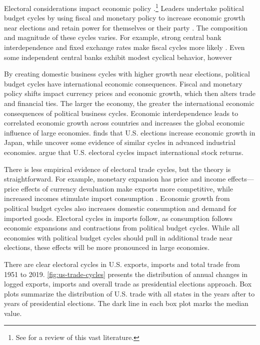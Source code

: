 \documentclass[12pt]{article}
\begin{document}
Electoral considerations impact economic policy \citep{Nordhaus1975}.\footnote{See \citet{Dubois2016} for a review of this vast literature.} 
Leaders undertake political budget cycles by using fiscal and monetary policy to increase economic growth near elections and retain power for themselves or their party \citep{Tufte1978, Rogoff1987}. 
The composition and magnitude of these cycles varies. 
For example, strong central bank interdependence and fixed exchange rates make fiscal cycles more likely \citep{ClarkHallerberg2000}. 
Even some independent central banks exhibit modest cyclical behavior, however \citep[pg. 247]{Dubois2016}


By creating domestic business cycles with higher growth near elections, political budget cycles have international economic consequences.
Fiscal and monetary policy shifts impact currency prices and economic growth, which then alters trade and financial ties. 
The larger the economy, the greater the international economic consequences of political business cycles.
Economic interdependence leads to correlated economic growth across countries \citep{ArtisZhang1999, Kayser2006} and increases the global economic influence of large economies. 
\citet{Ito1991} finds that U.S. elections increase economic growth in Japan, while \citet{ThompsonZuk1983} uncover some evidence of similar cycles in advanced industrial economies.
\citet{FoersterSchmitz1997} argue that U.S. electoral cycles impact international stock returns.


There is less empirical evidence of electoral trade cycles, but the theory is straightforward.
For example, monetary expansion has price and income effects--- price effects of currency devaluation make exports more competitive, while increased incomes stimulate import consumption \citep{Sumner2021}.
Economic growth from political budget cycles also increases domestic consumption and demand for imported goods. 
Electoral cycles in imports follow, as consumption follows economic expansions and contractions from political budget cycles.  
While all economies with political budget cycles should pull in additional trade near elections, these effects will be more pronounced in large economies. 


There are clear electoral cycles in U.S. exports, imports and total trade from 1951 to 2019. 
\autoref{fig:us-trade-cycles} presents the distribution of annual changes in logged exports, imports and overall trade as presidential elections approach.
Box plots summarize the distribution of U.S. trade with all states in the years after to years of presidential elections. 
The dark line in each box plot marks the median value. 
\end{document}
